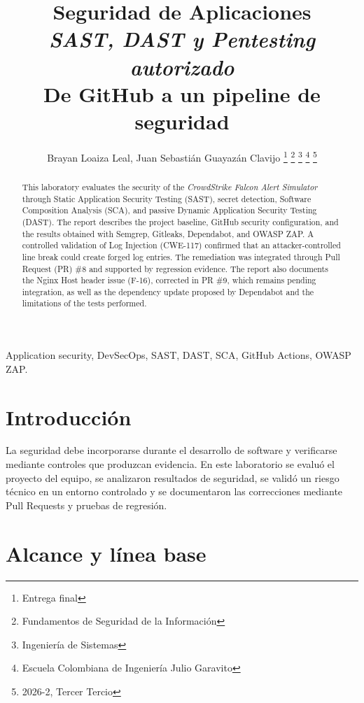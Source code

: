 \documentclass[journal]{IEEEtran}
\title{Seguridad de Aplicaciones\\
\large \textit{SAST, DAST y Pentesting autorizado}\\
\normalsize De GitHub a un pipeline de seguridad}
\author{Brayan Loaiza Leal,
Juan Sebastián Guayazán Clavijo
\thanks{Entrega final}
\thanks{Fundamentos de Seguridad de la Información}
\thanks{Ingeniería de Sistemas}
\thanks{Escuela Colombiana de Ingeniería Julio Garavito}
\thanks{2026-2, Tercer Tercio}}
\begin{document}
\maketitle

\begin{otherlanguage}{english}
\begin{abstract}
This laboratory evaluates the security of the \textit{CrowdStrike Falcon Alert Simulator} through Static Application Security Testing (SAST), secret detection, Software Composition Analysis (SCA), and passive Dynamic Application Security Testing (DAST). The report describes the project baseline, GitHub security configuration, and the results obtained with Semgrep, Gitleaks, Dependabot, and OWASP ZAP. A controlled validation of Log Injection (CWE-117) confirmed that an attacker-controlled line break could create forged log entries. The remediation was integrated through Pull Request (PR) \#8 and supported by regression evidence. The report also documents the Nginx Host header issue (F-16), corrected in PR \#9, which remains pending integration, as well as the dependency update proposed by Dependabot and the limitations of the tests performed.
\end{abstract}
\begin{IEEEkeywords}
Application security, DevSecOps, SAST, DAST, SCA, GitHub Actions, OWASP ZAP.
\end{IEEEkeywords}
\end{otherlanguage}

\section{Introducción}
La seguridad debe incorporarse durante el desarrollo de software y verificarse mediante controles que produzcan evidencia. En este laboratorio se evaluó el proyecto del equipo, se analizaron resultados de seguridad, se validó un riesgo técnico en un entorno controlado y se documentaron las correcciones mediante Pull Requests y pruebas de regresión.

\section{Alcance y línea base}
\end{document}
